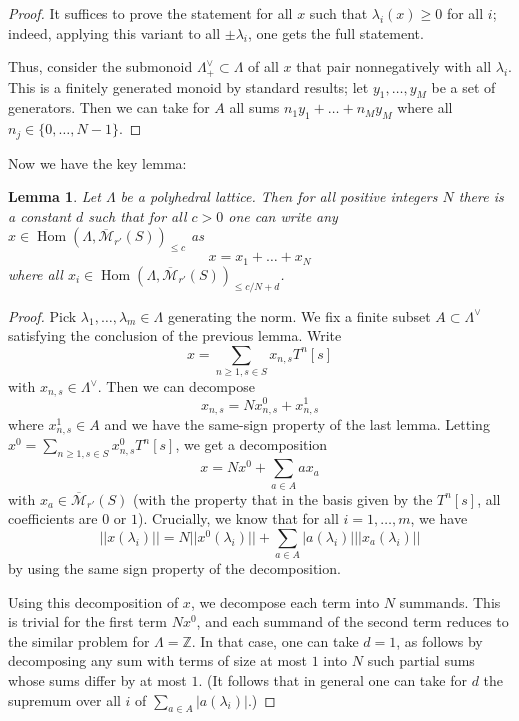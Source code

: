 \documentclass[11pt]{amsart}
\DeclareMathOperator{\Hom}{Hom}
\numberwithin{equation}{section}
\numberwithin{theorem}{section}
\newtheorem{lemma}[theorem]{Lemma}
\theoremstyle{definition}
\begin{document}
\begin{proof} It suffices to prove the statement for all $x$ such that $\lambda_i(x)\geq 0$ for all $i$; indeed, applying this variant to all $\pm \lambda_i$, one gets the full statement.

Thus, consider the submonoid $\Lambda^\vee_+\subset \Lambda$ of all $x$ that pair nonnegatively with all $\lambda_i$. This is a finitely generated monoid by standard results; let $y_1,\ldots,y_M$ be a set of generators. Then we can take for $A$ all sums $n_1y_1+\ldots+n_My_M$ where all $n_j\in \{0,\ldots,N-1\}$.
\end{proof}

Now we have the key lemma:

\begin{lemma}\label{lem:key} Let $\Lambda$ be a polyhedral lattice. Then for all positive integers $N$ there is a constant $d$ such that for all $c>0$ one can write any $x\in \Hom(\Lambda,\overline{\mathcal M}_{r'}(S))_{\leq c}$ as
\[
x=x_1+\ldots+x_N
\]
where all $x_i\in \Hom(\Lambda,\overline{\mathcal M}_{r'}(S))_{\leq c/N+d}$.
\end{lemma}

\begin{proof} Pick $\lambda_1,\ldots,\lambda_m\in \Lambda$ generating the norm. We fix a finite subset $A\subset \Lambda^\vee$ satisfying the conclusion of the previous lemma. Write
\[
x=\sum_{n\geq 1, s\in S} x_{n,s} T^n [s]
\]
with $x_{n,s}\in \Lambda^\vee$. Then we can decompose
\[
x_{n,s} = N x_{n,s}^0 + x_{n,s}^1
\]
where $x_{n,s}^1\in A$ and we have the same-sign property of the last lemma. Letting $x^0 = \sum_{n\geq 1, s\in S} x_{n,s}^0 T^n [s]$, we get a decomposition
\[
x = Nx^0 + \sum_{a\in A} a x_a
\]
with $x_a\in \overline{\mathcal M}_{r'}(S)$ (with the property that in the
basis given by the $T^n [s]$, all coefficients are $0$ or $1$). Crucially,
we know that for all $i=1,\ldots,m$, we have
\[
||x(\lambda_i)|| = N ||x^0(\lambda_i)|| + \sum_{a\in A} |a(\lambda_i)| ||x_a(\lambda_i)||
\]
by using the same sign property of the decomposition.

Using this decomposition of $x$, we decompose each term into $N$ summands. This is trivial for the first term $Nx^0$, and each summand of the second term reduces to the similar problem for $\Lambda=\mathbb Z$. In that case, one can take $d=1$, as follows by decomposing any sum with terms of size at most $1$ into $N$ such partial sums whose sums differ by at most $1$. (It follows that in general one can take for $d$ the supremum over all $i$ of $\sum_{a\in A} |a(\lambda_i)|$.)
\end{proof}
\end{document}

